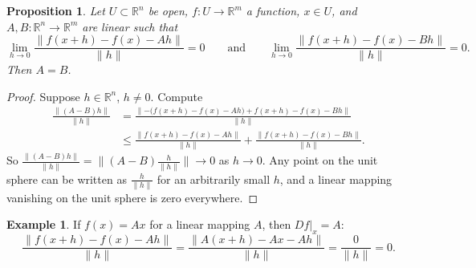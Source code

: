 \documentclass[12pt,openany]{book}
\newcommand{\snorm}[1]{\lVert {#1} \rVert}
\newcommand{\bnorm}[1]{\bigl\lVert {#1} \bigr\rVert}
\newcommand{\R}{{\mathbb{R}}}
\theoremstyle{plain}
\newtheorem{prop}[thm]{Proposition}
\theoremstyle{remark}
\theoremstyle{definition}
\theoremstyle{exercise}
\theoremstyle{example}
\newtheorem{example}[thm]{Example}
\begin{document}
\begin{prop}
Let $U \subset \R^n$ be open, $f \colon U \to \R^m$ a function,
$x \in U$, and 
$A,B \colon \R^n \to \R^m$ are linear such that
\begin{equation*}
\lim_{h \to 0}
\frac{\snorm{f(x+h)-f(x) - Ah}}{\snorm{h}} = 0
\qquad \text{and} \qquad
\lim_{h \to 0}
\frac{\snorm{f(x+h)-f(x) - Bh}}{\snorm{h}} = 0 .
\end{equation*}
Then $A=B$.
\end{prop}

\begin{proof}
Suppose $h \in \R^n$, $h \not= 0$.  Compute
\begin{equation*}
\begin{split}
\frac{\snorm{(A-B)h}}{\snorm{h}} & =
\frac{\snorm{-\bigl( f(x+h)-f(x) - Ah \bigr) + f(x+h)-f(x) - Bh}}{\snorm{h}} \\
& \leq
\frac{\snorm{f(x+h)-f(x) - Ah}}{\snorm{h}} + \frac{\snorm{f(x+h)-f(x) -
Bh}}{\snorm{h}} .
\end{split}
\end{equation*}
So 
$\frac{\snorm{(A-B)h}}{\snorm{h}} = \bnorm{(A-B)\frac{h}{\snorm{h}}} \to 0$
as $h \to 0$.  Any point on the unit sphere can be written as $\frac{h}{\snorm{h}}$
for an arbitrarily small $h$, and a linear mapping vanishing on the unit sphere is
zero everywhere.
\end{proof}

\begin{example}
If $f(x) = Ax$ for a linear mapping $A$, then
$Df|_x = A$:
\begin{equation*}
\frac{\snorm{f(x+h)-f(x) - Ah}}{\snorm{h}}
=
\frac{\snorm{A(x+h)-Ax - Ah}}{\snorm{h}}
=
\frac{0}{\snorm{h}} = 0 .
\end{equation*}
\end{example}
\end{document}
